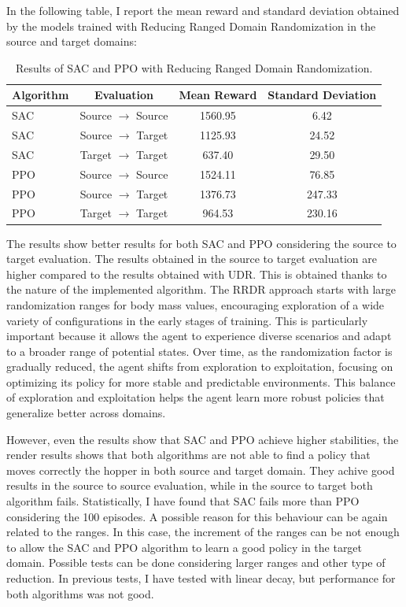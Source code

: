 \documentclass[12pt]{article}
\begin{document}
In the following table, I report the mean reward and standard deviation obtained by the models trained with Reducing Ranged Domain Randomization in the source and target domains:

\begin{table}[H]
    \centering
    \begin{tabular}{|l|c|c|c|}
        \hline
        \textbf{Algorithm} & \textbf{Evaluation} & \textbf{Mean Reward} & \textbf{Standard Deviation} \\ \hline
        SAC & Source $\rightarrow$ Source & 1560.95 & 6.42 \\ 
        SAC & Source $\rightarrow$ Target & 1125.93 & 24.52 \\ 
        SAC & Target $\rightarrow$ Target & 637.40 & 29.50 \\ \hline
        PPO & Source $\rightarrow$ Source & 1524.11 & 76.85 \\ 
        PPO & Source $\rightarrow$ Target & 1376.73 & 247.33 \\ 
        PPO & Target $\rightarrow$ Target & 964.53 & 230.16 \\ \hline
    \end{tabular}
    \caption{Results of SAC and PPO with Reducing Ranged Domain Randomization.}
    \label{tab:results_rrdr}
\end{table}

The results show better results for both SAC and PPO considering the source to target evaluation. The results obtained in the source to target evaluation are higher compared to the results obtained with UDR. This is obtained thanks to the nature of the implemented algorithm. The RRDR approach starts with large randomization ranges for body mass values, encouraging exploration of a wide variety of configurations in the early stages of training. This is particularly important because it allows the agent to experience diverse scenarios and adapt to a broader range of potential states. Over time, as the randomization factor is gradually reduced, the agent shifts from exploration to exploitation, focusing on optimizing its policy for more stable and predictable environments. This balance of exploration and exploitation helps the agent learn more robust policies that generalize better across domains.

However, even the results show that SAC and PPO achieve higher stabilities, the render results shows that both algorithms are not able to find a policy that moves correctly the hopper in both source and target domain. They achive good results in the source to source evaluation, while in the source to target both algorithm fails. Statistically, I have found that SAC fails more than PPO considering the 100 episodes. A possible reason for this behaviour can be again related to the ranges. In this case, the increment of the ranges can be not enough to allow the SAC and PPO algorithm to learn a good policy in the target domain. Possible tests can be done considering larger ranges and other type of reduction. In previous tests, I have tested with linear decay, but performance for both algorithms was not good.
\end{document}
